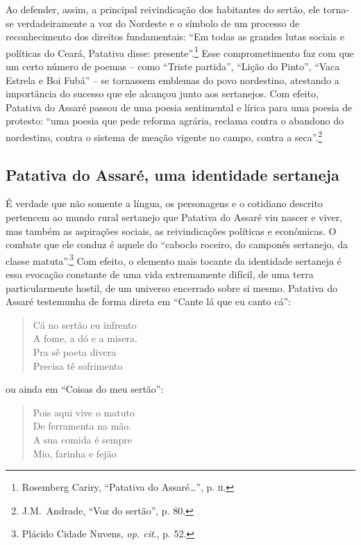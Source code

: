 Ao defender, assim, a principal reivindicação dos habitantes do sertão, ele
torna-se verdadeiramente a voz do Nordeste e o símbolo de um processo de
reconhecimento dos direitos fundamentais: “Em todas as grandes lutas sociais e
políticas do Ceará, Patativa disse: presente”.\footnote{ Rosemberg Cariry,
“Patativa do Assaré\ldots{}”, p. \textsc{ii}.} Esse comprometimento faz com que um certo
número de poemas -- como “Triste partida”, “Lição do Pinto”, “Vaca Estrela e Boi
Fubá” -- se tornassem emblemas do povo nordestino, atestando a importância do
sucesso que ele alcançou junto aos sertanejos. Com efeito, Patativa do Assaré
passou de uma poesia sentimental e lírica para uma poesia de protesto: “uma
poesia que pede reforma agrária, reclama contra o abandono do nordestino, contra
o sistema de meação vigente no campo, contra a seca”.\footnote{ J.M.~Andrade,
“Voz do sertão”, p. 80.}

\subsection{Patativa do Assaré, uma identidade sertaneja}

É verdade que não somente a língua, os personagens e o cotidiano descrito
pertencem ao mundo rural sertanejo que Patativa do Assaré viu nascer e viver,
mas também as aspirações sociais, as reivindicações políticas e econômicas. O
combate que ele conduz é aquele do “caboclo roceiro, do camponês sertanejo, da
classe matuta”.\footnote{ Plácido Cidade Nuvens, \textit{op. cit}., p. 52.} Com
efeito, o elemento mais tocante da identidade sertaneja é essa evocação
constante de uma vida extremamente difícil, de uma terra particularmente hostil,
de um universo encerrado sobre si mesmo. Patativa do Assaré testemunha de forma
direta em “Cante lá que eu canto cá”: 

\begin{verse}
Cá no sertão eu infrento\\
A fome, a dó e a misera.\\
Pra sê poeta divera\\
Precisa tê sofrimento 
\end{verse}

\noindent ou ainda em “Coisas do meu sertão”:

\begin{verse}
Pois aqui vive o matuto\\
De ferramenta na mão.\\
A sua comida é sempre\\
Mio, farinha e fejão
\end{verse}

